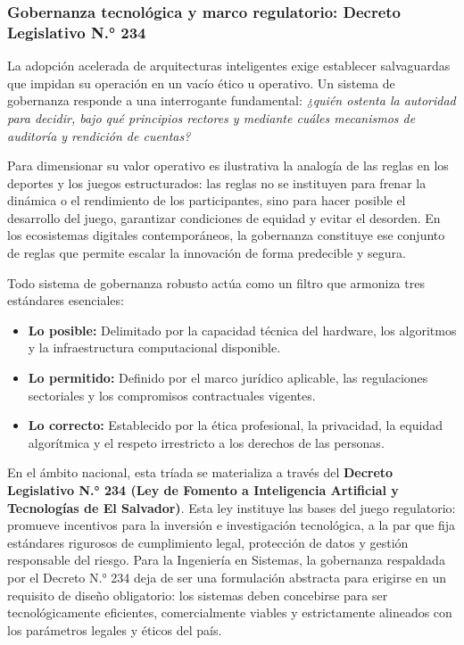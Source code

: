 \clearpage
\subsubsection*{\textcolor{unabblue}{\faBalanceScale}\quad Gobernanza tecnológica y marco regulatorio: Decreto Legislativo N.° 234}
La adopción acelerada de arquitecturas inteligentes exige establecer salvaguardas que impidan su operación en un vacío ético u operativo. Un sistema de gobernanza responde a una interrogante fundamental: \textit{¿quién ostenta la autoridad para decidir, bajo qué principios rectores y mediante cuáles mecanismos de auditoría y rendición de cuentas?}

Para dimensionar su valor operativo es ilustrativa la analogía de las reglas en los deportes y los juegos estructurados: las reglas no se instituyen para frenar la dinámica o el rendimiento de los participantes, sino para hacer posible el desarrollo del juego, garantizar condiciones de equidad y evitar el desorden. En los ecosistemas digitales contemporáneos, la gobernanza constituye ese conjunto de reglas que permite escalar la innovación de forma predecible y segura.

Todo sistema de gobernanza robusto actúa como un filtro que armoniza tres estándares esenciales:
\begin{itemize}
  \item \textbf{Lo posible:} Delimitado por la capacidad técnica del hardware, los algoritmos y la infraestructura computacional disponible.
  \item \textbf{Lo permitido:} Definido por el marco jurídico aplicable, las regulaciones sectoriales y los compromisos contractuales vigentes.
  \item \textbf{Lo correcto:} Establecido por la ética profesional, la privacidad, la equidad algorítmica y el respeto irrestricto a los derechos de las personas.
\end{itemize}

En el ámbito nacional, esta tríada se materializa a través del \textbf{Decreto Legislativo N.° 234 (Ley de Fomento a Inteligencia Artificial y Tecnologías de El Salvador)}. Esta ley instituye las bases del juego regulatorio: promueve incentivos para la inversión e investigación tecnológica, a la par que fija estándares rigurosos de cumplimiento legal, protección de datos y gestión responsable del riesgo. Para la Ingeniería en Sistemas, la gobernanza respaldada por el Decreto N.° 234 deja de ser una formulación abstracta para erigirse en un requisito de diseño obligatorio: los sistemas deben concebirse para ser tecnológicamente eficientes, comercialmente viables y estrictamente alineados con los parámetros legales y éticos del país.
